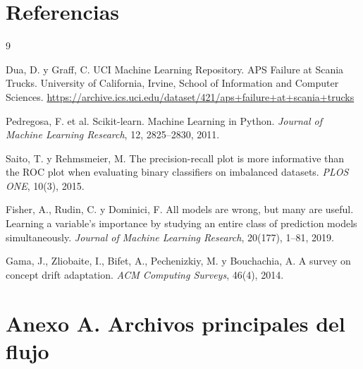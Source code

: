 \documentclass[11pt,a4paper]{article}
\begin{document}
\section{Referencias}
\label{sec_referencias}

\begin{thebibliography}{9}

Dua, D. y Graff, C.
\newblock UCI Machine Learning Repository. APS Failure at Scania Trucks.
\newblock University of California, Irvine, School of Information and Computer Sciences.
\newblock \url{https://archive.ics.uci.edu/dataset/421/aps+failure+at+scania+trucks}

Pedregosa, F. et al.
\newblock Scikit-learn. Machine Learning in Python.
\newblock \textit{Journal of Machine Learning Research}, 12, 2825--2830, 2011.

Saito, T. y Rehmsmeier, M.
\newblock The precision-recall plot is more informative than the ROC plot when evaluating binary classifiers on imbalanced datasets.
\newblock \textit{PLOS ONE}, 10(3), 2015.

Fisher, A., Rudin, C. y Dominici, F.
\newblock All models are wrong, but many are useful. Learning a variable's importance by studying an entire class of prediction models simultaneously.
\newblock \textit{Journal of Machine Learning Research}, 20(177), 1--81, 2019.

Gama, J., Zliobaite, I., Bifet, A., Pechenizkiy, M. y Bouchachia, A.
\newblock A survey on concept drift adaptation.
\newblock \textit{ACM Computing Surveys}, 46(4), 2014.

\end{thebibliography}

\appendix

\section{Anexo A. Archivos principales del flujo}
\label{anexo_archivos}
\end{document}
